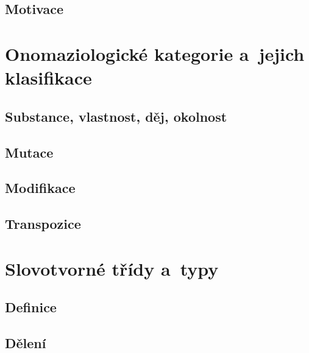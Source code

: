 \hypertarget{motivace}{%
\subsection{Motivace}\label{motivace}}

\hypertarget{onomaziologickuxe9-kategorie-a-jejich-klasifikace}{%
\section{Onomaziologické kategorie a~jejich
klasifikace}\label{onomaziologickuxe9-kategorie-a-jejich-klasifikace}}

\hypertarget{substance-vlastnost-dux11bj-okolnost}{%
\subsection{Substance, vlastnost, děj,
okolnost}\label{substance-vlastnost-dux11bj-okolnost}}

\hypertarget{mutace}{%
\subsection{Mutace}\label{mutace}}

\hypertarget{modifikace}{%
\subsection{Modifikace}\label{modifikace}}

\hypertarget{transpozice}{%
\subsection{Transpozice}\label{transpozice}}

\hypertarget{slovotvornuxe9-tux159uxeddy-a-typy}{%
\section{Slovotvorné třídy
a~typy}\label{slovotvornuxe9-tux159uxeddy-a-typy}}

\hypertarget{definice}{%
\subsection{Definice}\label{definice}}

\hypertarget{dux11blenuxed}{%
\subsection{Dělení}\label{dux11blenuxed}}

